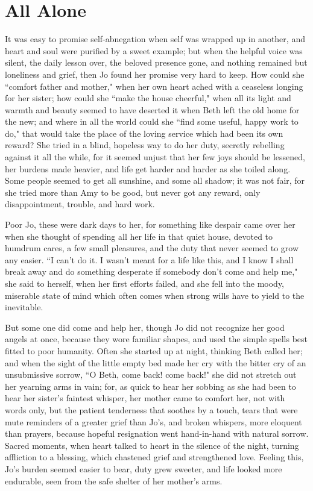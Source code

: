 \chapter{All Alone}

{It} was easy to promise self-abnegation when self was wrapped up in
another, and heart and soul were purified by a sweet example; but when
the helpful voice was silent, the daily lesson over, the beloved
presence gone, and nothing remained but loneliness and grief, then Jo
found her promise very hard to keep. How could she ``comfort father and
mother," when her own heart ached with a ceaseless longing for her
sister; how could she ``make the house cheerful," when all its light and
warmth and beauty seemed to have deserted it when Beth left the old home
for the new; and where in all the world could she ``find some useful,
happy work to do," that would take the place of the loving service which
had been its own reward? She tried in a blind, hopeless way to do her
duty, secretly rebelling against it all the while, for it seemed unjust
that her few joys should be lessened, her burdens made heavier, and life
get harder and harder as she toiled along. Some people seemed to get all
sunshine, and some all shadow; it was not fair, for she tried more than
Amy to be good, but never got any reward, only disappointment, trouble,
and hard work.

Poor Jo, these were dark days to her, for something like despair came
over her when she thought of spending all her life in that quiet house,
devoted to humdrum cares, a few small pleasures, and the duty that never
seemed to grow any easier. ``I can't do it. I
wasn't meant for a life like this, and I know I shall
break away and do something desperate if somebody don't
come and help me," she said to herself, when her first efforts failed,
and she fell into the moody, miserable state of mind which often comes
when strong wills have to yield to the inevitable.

But some one did come and help her, though Jo did not recognize her good
angels at once, because they wore familiar shapes, and used the simple
spells best fitted to poor humanity. Often she started up at night,
thinking Beth called her; and when the sight of the little empty bed
made her cry with the bitter cry of an unsubmissive sorrow, ``O Beth,
come back! come back!" she did not stretch out her yearning arms in
vain; for, as quick to hear her sobbing as she had been to hear her
sister's faintest whisper, her mother came to comfort
her, not with words only, but the patient tenderness that soothes by a
touch, tears that were mute reminders of a greater grief than
Jo's, and broken whispers, more eloquent than prayers,
because hopeful resignation went hand-in-hand with natural sorrow.
Sacred moments, when heart talked to heart in the silence of the night,
turning affliction to a blessing, which chastened grief and strengthened
love. Feeling this, Jo's burden seemed easier to bear,
duty grew sweeter, and life looked more endurable, seen from the safe
shelter of her mother's arms.

